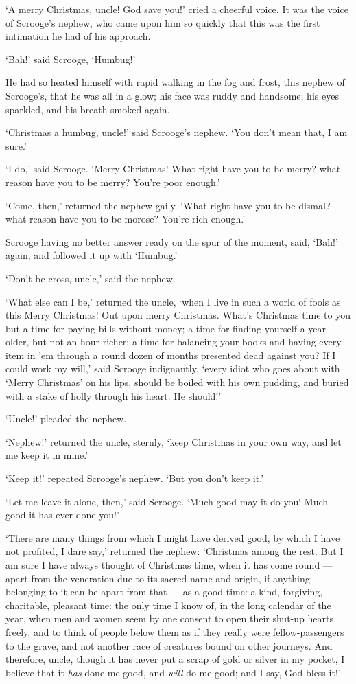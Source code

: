 \documentclass[11pt,twoside]{article}\makeatletter
\begin{document}
‘A merry Christmas, uncle!  God save you!’ cried a cheerful voice.  It was the voice of Scrooge's nephew, who came upon him so quickly that this was the first intimation he had of his approach.   \par
‘Bah!’ said Scrooge, ‘Humbug!’  \par
He had so heated himself with rapid walking in the fog and frost, this nephew of Scrooge's, that he was all in a glow; his face was ruddy and handsome; his eyes sparkled, and his breath smoked again.  \par
‘Christmas a humbug, uncle!’ said Scrooge's nephew.  ‘You don't mean that, I am sure.’  \par
‘I do,’ said Scrooge.  ‘Merry Christmas!  What right have you to be merry?  what reason have you to be merry? You're poor enough.’  \par
‘Come, then,’ returned the nephew gaily.  ‘What right have you to be dismal?  what reason have you to be morose? You're rich enough.’  \par
Scrooge having no better answer ready on the spur of the moment, said, ‘Bah!’ again; and followed it up with  ‘Humbug.’  \par
‘Don't be cross, uncle,’ said the nephew.  \par
‘What else can I be,’ returned the uncle, ‘when I live in such a world of fools as this  Merry Christmas!  Out upon merry Christmas.  What's Christmas time to you but a time for  paying bills without money; a time for finding yourself a year older, but not an hour richer; a time for balancing your books and having every item in 'em through a round dozen of months presented dead against you?  If I could work my will,’ said Scrooge indignantly, ‘every idiot who goes about with ‘Merry Christmas’ on his lips, should be boiled with his own pudding, and buried with a stake of holly through his heart.  He should!’  \par
‘Uncle!’ pleaded the nephew.  \par
‘Nephew!’ returned the uncle, sternly, ‘keep Christmas in your own way, and let me keep it in mine.’  \par
‘Keep it!’ repeated Scrooge's nephew.  ‘But you don't keep it.’  \par
‘Let me leave it alone, then,’ said Scrooge.  ‘Much good may it do you!  Much good it has ever done you!’  \par
‘There are many things from which I might have derived good, by which I have not profited, I dare say,’ returned the nephew:  ‘Christmas among the rest.  But I am sure I have always thought of Christmas time, when it has come round  — apart from the veneration due to its sacred name and origin, if anything belonging to it can be apart from that — as a good time: a kind, forgiving, charitable, pleasant time: the only time I know of, in the long calendar of the year, when men and women seem by one consent to open their shut-up hearts freely, and to think of people below them as if they really were fellow-passengers to the grave, and not another race of creatures bound on other journeys.  And therefore, uncle, though it has never put a scrap of gold or silver in my pocket, I believe that it \textit{has} done me good, and \textit{will} do me good; and I say, God bless it!’  \par
\end{document}
